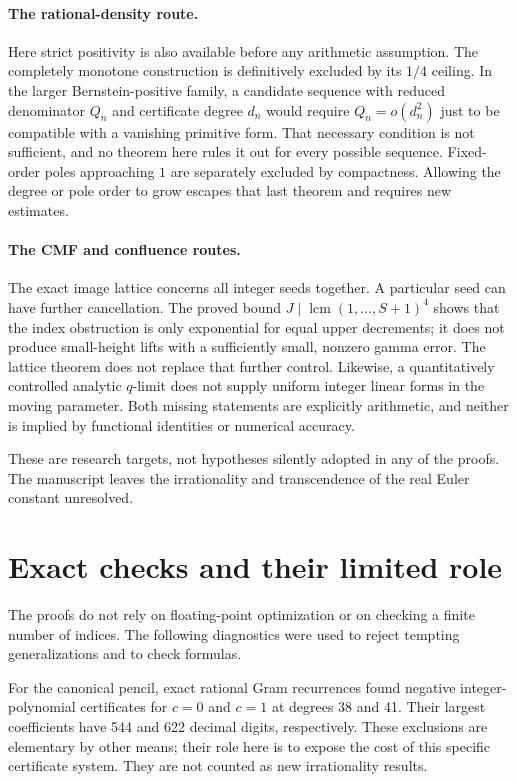\documentclass[11pt,a4paper]{article}
\theoremstyle{definition}
\theoremstyle{remark}
\DeclareMathOperator{\lcm}{lcm}
\numberwithin{equation}{section}
\renewcommand{\thesection}{\Roman{part}.\arabic{section}}
\renewcommand{\theHsection}{\arabic{part}.main.\arabic{section}}
\newcommand{\PartAppendix}{%
 \setcounter{section}{0}\setcounter{subsection}{0}%
 \renewcommand{\thesection}{\Roman{part}.\Alph{section}}%
 \renewcommand{\theHsection}{\arabic{part}.appendix.\arabic{section}}}
\begin{document}
\paragraph{The rational-density route.}
Here strict positivity is also available before any arithmetic
assumption. The completely monotone construction is definitively
excluded by its $1/4$ ceiling. In the larger Bernstein-positive
family, a candidate sequence with reduced denominator $Q_n$ and
certificate degree $d_n$ would require $Q_n=o(d_n^2)$ just to be
compatible with a vanishing primitive form. That necessary condition
is not sufficient, and no theorem here rules it out for every
possible sequence. Fixed-order poles approaching $1$ are separately
excluded by compactness. Allowing the degree or pole order to grow
escapes that last theorem and requires new estimates.

\paragraph{The CMF and confluence routes.}
The exact image lattice concerns all integer seeds together. A
particular seed can have further cancellation. The proved bound
$J\mid\lcm(1,\ldots,S+1)^4$ shows that the index obstruction is
only exponential for equal upper decrements; it does not produce
small-height lifts with a sufficiently small, nonzero gamma error.
The lattice theorem does not replace that further control. Likewise, a
quantitatively controlled analytic $q$-limit does not supply uniform
integer linear forms in the moving parameter. Both missing
statements are explicitly arithmetic, and neither is implied by
functional identities or numerical accuracy.

These are research targets, not hypotheses silently adopted in any
of the proofs. The manuscript leaves the irrationality and
transcendence of the real Euler constant unresolved.

\PartAppendix
\section{Exact checks and their limited role}

The proofs do not rely on floating-point optimization or on checking
a finite number of indices. The following diagnostics were used to
reject tempting generalizations and to check formulas.

For the canonical pencil, exact rational Gram recurrences found
negative integer-polynomial certificates for $c=0$ and $c=1$ at
degrees 38 and 41. Their largest coefficients have 544 and 622
decimal digits, respectively. These exclusions are elementary by
other means; their role here is to expose the cost of this specific
certificate system. They are not counted as new irrationality
results.
\end{document}
